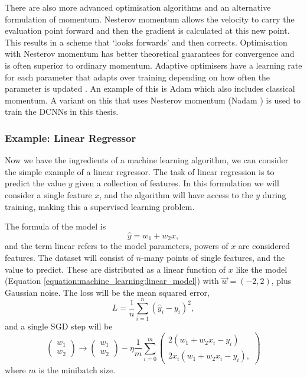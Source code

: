 There are also more advanced optimisation algorithms and an alternative formulation of momentum.
Nesterov momentum \cite{Nesterov} allows the velocity to carry the evaluation point forward and then the gradient is calculated at this new point. 
This results in a scheme that `looks forwards' and then corrects.
Optimisation with Nesterov momentum has better theoretical guarantees for convergence and is often superior to ordinary momentum.
Adaptive optimisers have a learning rate for each parameter that adapts over training depending on how often the parameter is updated \cite{CS231n}.
An example of this is Adam \cite{Adam} which also includes classical momentum. A variant on this that uses Nesterov momentum (Nadam \cite{Nadam}) is used to train the DCNNs in this thesis. 






\subsubsection{Example: Linear Regressor}
Now we have the ingredients of a machine learning algorithm, we can consider the simple example of a linear regressor. 
The task of linear regression is to predict the value $y$ given a collection of features. In this formulation we will consider a single feature $x$, and the algorithm will have access to the $y$ during training, making this a supervised learning problem. 

The formula of the model is
\begin{equation}
    \hat{y} = w_{1} + w_{2}x,
    \label{equation:machine_learning:linear_model}
\end{equation}
and the term linear refers to the model parameters, powers of $x$ are considered features. 
The dataset will consist of $n$-many points of single features, and the value to predict. 
These are distributed as a linear function of $x$ like the model (Equation \ref{equation:machine_learning:linear_model}) with $\vec{w} = (-2,2)$, plus Gaussian noise.
The loss will be the mean squared error,
\begin{equation}
    L = \frac{1}{n}\sum_{i=1}^{n}(\hat{y}_{i}-y_{i})^{2},
\end{equation} 
and a single SGD step will be 
\begin{equation}
    \begin{pmatrix}
        w_{1} \\
        w_{2}
    \end{pmatrix} \rightarrow
    \begin{pmatrix}
        w_{1} \\
        w_{2}
    \end{pmatrix} - \eta
    \frac{1}{m}\sum_{i=0}^{m}
    \begin{pmatrix}
        2(w_{1}+w_{2}x_{i} - y_{i})\\
        2x_{i}(w_{1}+w_{2}x_{i} - y_{i}),
    \end{pmatrix}
\end{equation}
where $m$ is the minibatch size.

